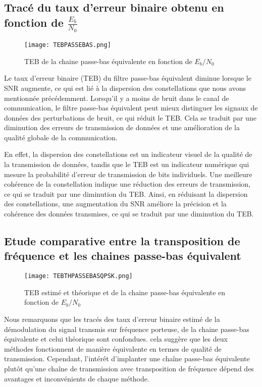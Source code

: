\documentclass[11pt]{article}
\begin{document}
\subsection{Tracé du taux d’erreur binaire obtenu en fonction de $\frac{E_b}{N_0}$}

\begin{figure}[ht!]
    \centering
    \texttt{[image: TEBPASSEBAS.png]}
    \caption{TEB de la chaine passe-bas équivalente en fonction de $E_b/N_0$  \label{fig : TEBQPSK}}
\end{figure}

Le taux d'erreur binaire (TEB) du filtre passe-bas équivalent diminue lorsque le SNR augmente, ce qui est lié à la dispersion des constellations que nous avons mentionnée précédemment. Lorsqu'il y a moins de bruit dans le canal de communication, le filtre passe-bas équivalent peut mieux distinguer les signaux de données des perturbations de bruit, ce qui réduit le TEB. Cela se traduit par une diminution des erreurs de transmission de données et une amélioration de la qualité globale de la communication.

En effet, la dispersion des constellations est un indicateur visuel de la qualité de la transmission de données, tandis que le TEB est un indicateur numérique qui mesure la probabilité d'erreur de transmission de bits individuels. Une meilleure cohérence de la constellation indique une réduction des erreurs de transmission, ce qui se traduit par une diminution du TEB. Ainsi, en réduisant la dispersion des constellations, une augmentation du SNR améliore la précision et la cohérence des données transmises, ce qui se traduit par une diminution du TEB.
\subsection{Etude comparative entre la transposition de fréquence et les chaines passe-bas équivalent}

\begin{figure}[ht!]
    \centering
    \texttt{[image: TEBTHPASSEBASQPSK.png]}
    \caption{TEB estimé et théorique et de la chaine passe-bas équivalente en fonction de $E_b/N_0$  \label{fig : TEBQPSK}}
\end{figure}
Nous remarquons que les tracés des taux d'erreur binaire estimé de la démodulation du signal transmis sur fréquence porteuse, de la chaine passe-bas équivalente et celui théorique sont confondues. cela suggère que les deux méthodes fonctionnent de manière équivalente en termes de qualité de transmission. Cependant, l'intérêt d'implanter une chaîne passe-bas équivalente plutôt qu'une chaîne de transmission avec transposition de fréquence dépend des avantages et inconvénients de chaque méthode.
\end{document}
